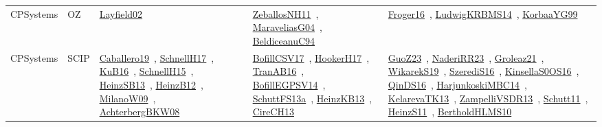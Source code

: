 {\begin{longtable}{lp{3cm}>{\raggedright\arraybackslash}p{6cm}>{\raggedright\arraybackslash}p{6cm}>{\raggedright\arraybackslash}p{8cm}}
CPSystems & OZ & \href{../works/Layfield02.pdf}{Layfield02}~\cite{Layfield02} & \href{../works/ZeballosNH11.pdf}{ZeballosNH11}~\cite{ZeballosNH11}, \href{../works/MaraveliasG04.pdf}{MaraveliasG04}~\cite{MaraveliasG04}, \href{../works/BeldiceanuC94.pdf}{BeldiceanuC94}~\cite{BeldiceanuC94} & \href{../works/Froger16.pdf}{Froger16}~\cite{Froger16}, \href{../works/LudwigKRBMS14.pdf}{LudwigKRBMS14}~\cite{LudwigKRBMS14}, \href{../works/KorbaaYG99.pdf}{KorbaaYG99}~\cite{KorbaaYG99}\\
CPSystems & SCIP & \href{../works/Caballero19.pdf}{Caballero19}~\cite{Caballero19}, \href{../works/SchnellH17.pdf}{SchnellH17}~\cite{SchnellH17}, \href{../works/KuB16.pdf}{KuB16}~\cite{KuB16}, \href{../works/SchnellH15.pdf}{SchnellH15}~\cite{SchnellH15}, \href{../works/HeinzSB13.pdf}{HeinzSB13}~\cite{HeinzSB13}, \href{../works/HeinzB12.pdf}{HeinzB12}~\cite{HeinzB12}, \href{../works/MilanoW09.pdf}{MilanoW09}~\cite{MilanoW09}, \href{../works/AchterbergBKW08.pdf}{AchterbergBKW08}~\cite{AchterbergBKW08} & \href{../works/BofillCSV17.pdf}{BofillCSV17}~\cite{BofillCSV17}, \href{../works/HookerH17.pdf}{HookerH17}~\cite{HookerH17}, \href{../works/TranAB16.pdf}{TranAB16}~\cite{TranAB16}, \href{../works/BofillEGPSV14.pdf}{BofillEGPSV14}~\cite{BofillEGPSV14}, \href{../works/SchuttFS13a.pdf}{SchuttFS13a}~\cite{SchuttFS13a}, \href{../works/HeinzKB13.pdf}{HeinzKB13}~\cite{HeinzKB13}, \href{../works/CireCH13.pdf}{CireCH13}~\cite{CireCH13} & \href{../works/GuoZ23.pdf}{GuoZ23}~\cite{GuoZ23}, \href{../works/NaderiRR23.pdf}{NaderiRR23}~\cite{NaderiRR23}, \href{../works/Groleaz21.pdf}{Groleaz21}~\cite{Groleaz21}, \href{../works/WikarekS19.pdf}{WikarekS19}~\cite{WikarekS19}, \href{../works/SzerediS16.pdf}{SzerediS16}~\cite{SzerediS16}, \href{../works/KinsellaS0OS16.pdf}{KinsellaS0OS16}~\cite{KinsellaS0OS16}, \href{../works/QinDS16.pdf}{QinDS16}~\cite{QinDS16}, \href{../works/HarjunkoskiMBC14.pdf}{HarjunkoskiMBC14}~\cite{HarjunkoskiMBC14}, \href{../works/KelarevaTK13.pdf}{KelarevaTK13}~\cite{KelarevaTK13}, \href{../works/ZampelliVSDR13.pdf}{ZampelliVSDR13}~\cite{ZampelliVSDR13}, \href{../works/Schutt11.pdf}{Schutt11}~\cite{Schutt11}, \href{../works/HeinzS11.pdf}{HeinzS11}~\cite{HeinzS11}, \href{../works/BertholdHLMS10.pdf}{BertholdHLMS10}~\cite{BertholdHLMS10}\\

\end{longtable}}
